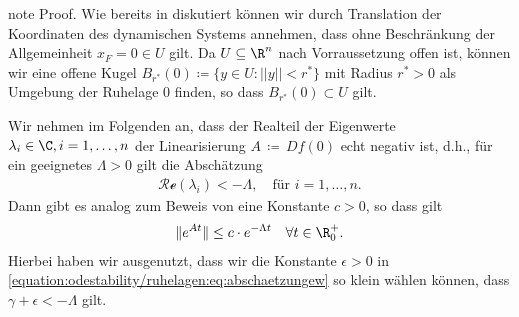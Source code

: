 \documentclass[letterpaper,10pt,english]{jupyterBook}
\begin{document}
\begin{sphinxadmonition}{note}
\sphinxAtStartPar
Proof. Wie bereits in {\hyperref[\detokenize{odestability/ruhelagen:s-linearisierung-ruhelage}]{}} diskutiert können wir durch Translation der Koordinaten des dynamischen Systems annehmen, dass ohne Beschränkung der Allgemeinheit \(x_F = 0 \in U\) gilt.
Da \(U\subseteq\R^n\) nach Vorraussetzung offen ist, können wir eine offene Kugel \(B_{{r^\ast}}(0) \coloneqq \{y \in U \colon ||y|| < {r^\ast}\}\) mit Radius \({r^\ast} > 0\) als Umgebung der Ruhelage \(0\) finden, so dass \(B_{r^\ast}(0) \subset U\) gilt.

\sphinxAtStartPar
Wir nehmen im Folgenden an, dass der Realteil der Eigenwerte \(\lambda_i \in \C, i=1,\ldots,n\) der Linearisierung \(A \, \coloneqq \, Df(0)\) echt negativ ist, d.h., für ein geeignetes \(\Lambda > 0\) gilt die Abschätzung
\begin{equation*}
\begin{split}\mathcal{Re}(\lambda_i)< -\Lambda, \quad \text{für } i=1,\ldots,n. \end{split}
\end{equation*}
\sphinxAtStartPar
Dann gibt es analog zum Beweis von {\hyperref[\detokenize{odestability/ruhelagen:thm:stablin}]{}} eine Konstante \(c>0\), so dass gilt
\begin{equation}\label{equation:odestability/ruhelagen:eq:normexp}
\begin{split}\|e^{At}\| \leq c\cdot e^{-\Lambda t}\quad \forall t\in \R^+_0.\end{split}
\end{equation}
\sphinxAtStartPar
Hierbei haben wir ausgenutzt, dass wir die Konstante \(\epsilon > 0\) in \eqref{equation:odestability/ruhelagen:eq:abschaetzungew} so klein wählen können, dass \(\gamma + \epsilon < -\Lambda\) gilt.


\end{sphinxadmonition}
\end{document}

